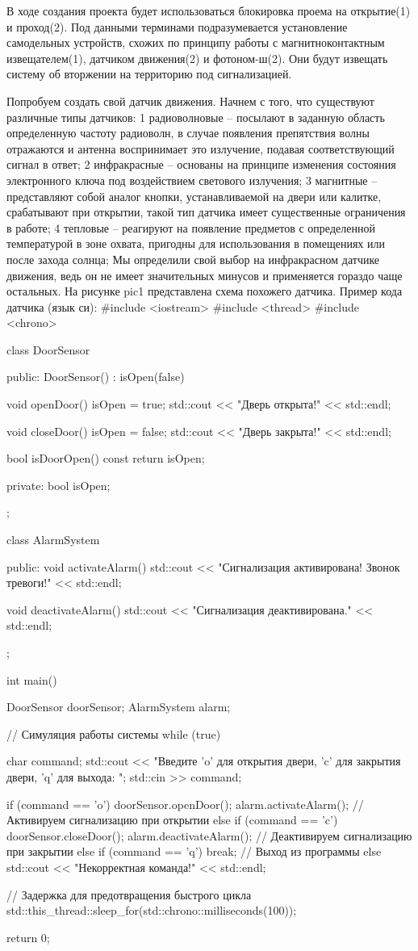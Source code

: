 В ходе создания проекта будет использоваться блокировка проема на открытие(1) и проход(2). Под данными терминами подразумевается установление 
самодельных устройств, схожих по принципу работы с магнитноконтактным извещателем(1), датчиком движения(2) и фотоном-ш(2). Они будут извещать 
систему об вторжении на территорию под сигнализацией. 

Попробуем создать свой датчик движения. Начнем с того, что существуют различные типы датчиков:
1 радиоволновые – посылают в заданную область определенную частоту радиоволн, в случае появления препятствия волны отражаются и антенна воспринимает 
это излучение, подавая соответствующий сигнал в ответ;
2 инфракрасные – основаны на принципе изменения состояния электронного ключа под воздействием светового излучения;
3 магнитные – представляют собой аналог кнопки, устанавливаемой на двери или калитке, срабатывают при открытии, такой тип датчика имеет существенные 
ограничения в работе;
4 тепловые – реагируют на появление предметов с определенной температурой в зоне охвата, пригодны для использования в помещениях или после захода солнца;
Мы определили свой выбор на инфракрасном датчике движения, ведь он не имеет значительных минусов и применяется гораздо чаще остальных. 
На рисунке pic1 представлена схема похожего датчика.
Пример кода датчика (язык си):
#include <iostream>
#include <thread>
#include <chrono>

class DoorSensor {
public:
    DoorSensor() : isOpen(false) {}

    void openDoor() {
        isOpen = true;
        std::cout << "Дверь открыта!" << std::endl;
    }

    void closeDoor() {
        isOpen = false;
        std::cout << "Дверь закрыта!" << std::endl;
    }

    bool isDoorOpen() const {
        return isOpen;
    }

private:
    bool isOpen;
};

class AlarmSystem {
public:
    void activateAlarm() {
        std::cout << "Сигнализация активирована! Звонок тревоги!" << std::endl;
    }

    void deactivateAlarm() {
        std::cout << "Сигнализация деактивирована." << std::endl;
    }
};

int main() {
    DoorSensor doorSensor;
    AlarmSystem alarm;

    // Симуляция работы системы
    while (true) {
        char command;
        std::cout << "Введите 'o' для открытия двери, 'c' для закрытия двери, 'q' для выхода: ";
        std::cin >> command;

        if (command == 'o') {
            doorSensor.openDoor();
            alarm.activateAlarm(); // Активируем сигнализацию при открытии
        } else if (command == 'c') {
            doorSensor.closeDoor();
            alarm.deactivateAlarm(); // Деактивируем сигнализацию при закрытии
        } else if (command == 'q') {
            break; // Выход из программы
        } else {
            std::cout << "Некорректная команда!" << std::endl;
        }

        // Задержка для предотвращения быстрого цикла
        std::this_thread::sleep_for(std::chrono::milliseconds(100));
    }

    return 0;
}
